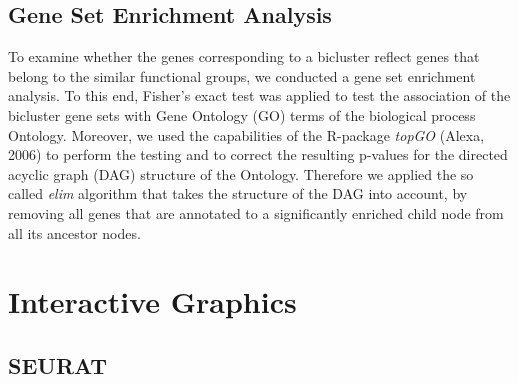 \subsection{Gene Set Enrichment Analysis}
To examine whether the genes corresponding to a bicluster reflect genes that belong to the similar functional groups, we conducted a gene set enrichment analysis.
To this end, Fisher's exact test was applied to test the association of the bicluster gene sets with Gene Ontology (GO) terms of the biological process Ontology.
Moreover, we used the capabilities of the R-package \textit{topGO} (Alexa, 2006) to perform the testing and to correct the resulting p-values for the directed acyclic graph (DAG) structure of the Ontology. Therefore we applied the so called \textit{elim} algorithm that takes the structure of the DAG into account, by removing all genes that are annotated to a significantly enriched child node from all its ancestor nodes. 

\section{Interactive Graphics}
\subsection{SEURAT}


